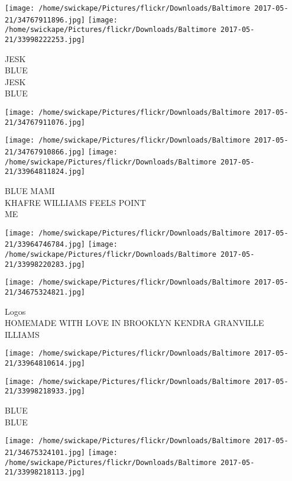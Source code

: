 \documentclass[10pt,letterpaper]{article}
\begin{document}
\texttt{[image: /home/swickape/Pictures/flickr/Downloads/Baltimore 2017-05-21/34767911896.jpg]}
\texttt{[image: /home/swickape/Pictures/flickr/Downloads/Baltimore 2017-05-21/33998222253.jpg]}

JESK\\
BLUE\\
JESK\\
BLUE\\
\pagebreak

\texttt{[image: /home/swickape/Pictures/flickr/Downloads/Baltimore 2017-05-21/34767911076.jpg]}

\vspace{0.25in}
\texttt{[image: /home/swickape/Pictures/flickr/Downloads/Baltimore 2017-05-21/34767910866.jpg]}
\texttt{[image: /home/swickape/Pictures/flickr/Downloads/Baltimore 2017-05-21/33964811824.jpg]}

BLUE MAMI\\
KHAFRE WILLIAMS FEELS POINT\\
ME\\
\pagebreak

\texttt{[image: /home/swickape/Pictures/flickr/Downloads/Baltimore 2017-05-21/33964746784.jpg]}
\texttt{[image: /home/swickape/Pictures/flickr/Downloads/Baltimore 2017-05-21/33998220283.jpg]}

\texttt{[image: /home/swickape/Pictures/flickr/Downloads/Baltimore 2017-05-21/34675324821.jpg]}

Logos\\
HOMEMADE WITH LOVE IN BROOKLYN KENDRA GRANVILLE\\
ILLIAMS\\
\pagebreak

\texttt{[image: /home/swickape/Pictures/flickr/Downloads/Baltimore 2017-05-21/33964810614.jpg]}

\vspace{0.25in}
\texttt{[image: /home/swickape/Pictures/flickr/Downloads/Baltimore 2017-05-21/33998218933.jpg]}

BLUE\\
BLUE\\
\pagebreak

\texttt{[image: /home/swickape/Pictures/flickr/Downloads/Baltimore 2017-05-21/34675324101.jpg]}
\texttt{[image: /home/swickape/Pictures/flickr/Downloads/Baltimore 2017-05-21/33998218113.jpg]}
\end{document}
